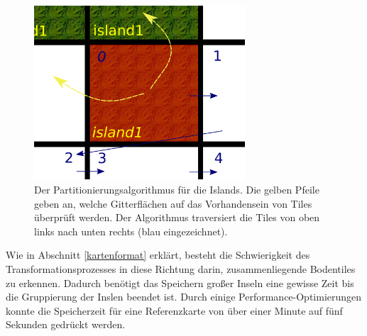 %
%
\begin{figure}[htbp]
  \centering

    \includegraphics[width=0.7\textwidth]{gfx/merge_algorithm.png}

  \caption{Der Partitionierungsalgorithmus für die Islands. Die gelben Pfeile
  geben an, welche Gitterflächen auf das Vorhandensein von Tiles überprüft
  werden. Der Algorithmus traversiert die Tiles von oben links nach unten
  rechts (blau eingezeichnet).}
  \label{figure:automaton-intersection}
\end{figure}

Wie in Abschnitt \ref{kartenformat} erklärt, besteht die Schwierigkeit des
Transformationsprozesses in diese Richtung darin, zusammenliegende Bodentiles zu
erkennen. Dadurch benötigt das Speichern großer Inseln eine gewisse Zeit bis die
Gruppierung der Inslen beendet ist. Durch einige Performance-Optimierungen
konnte die Speicherzeit für eine Referenzkarte von über einer Minute auf fünf
Sekunden gedrückt werden.
